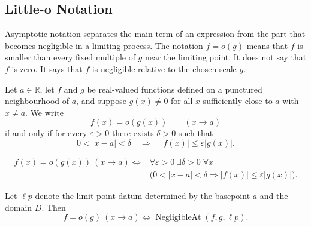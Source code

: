 
\subsection*{Little-o Notation}
\label{subsec:little-o-notation}

\begin{remark*}[Orientation]
Asymptotic notation separates the main term of an expression from the part
that becomes negligible in a limiting process. The notation $f=o(g)$ means
that $f$ is smaller than every fixed multiple of $g$ near the limiting point.
It does not say that $f$ is zero. It says that $f$ is negligible relative to
the chosen scale $g$.
\end{remark*}

\begin{definition}
\label{def:little-o-at-a-point}
Let $a\in\mathbb{R}$, let $f$ and $g$ be real-valued functions defined on a
punctured neighbourhood of $a$, and suppose $g(x)\neq 0$ for all $x$ sufficiently
close to $a$ with $x\neq a$. We write
\[
  f(x)=o(g(x))\qquad (x\to a)
\]
if and only if for every $\varepsilon>0$ there exists $\delta>0$ such that
\[
  0<|x-a|<\delta
  \quad\Longrightarrow\quad
  |f(x)|\leq \varepsilon |g(x)|.
\]
\end{definition}

\begin{remark*}
\[
\begin{aligned}
f(x)=o(g(x))\ (x\to a)
\Longleftrightarrow
&\forall\varepsilon>0\;\exists\delta>0\;\forall x\\
&\bigl(0<|x-a|<\delta
  \Rightarrow |f(x)|\leq \varepsilon |g(x)|\bigr).
\end{aligned}
\]
\end{remark*}

\begin{remark*}
Let \(\ell p\) denote the limit-point datum determined by the basepoint \(a\)
and the domain \(D\). Then
\[
f=o(g)\ (x\to a)
\Longleftrightarrow
\operatorname{NegligibleAt}(f,g,\ell p).
\]
\end{remark*}

